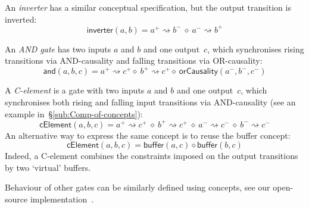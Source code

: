 \documentclass[british,compsoc]{IEEEtran}
\begin{document}
An \emph{inverter} has a similar conceptual specification, but the
output transition is inverted:
\[
\mathsf{inverter}(a, b)=a^{+}\rightsquigarrow b^{-}\ \diamond\ a^{-}\rightsquigarrow b^{+}
\]

An \emph{AND gate} has two inputs $a$ and $b$ and one output~$c$, which
synchronises rising transitions via AND-causality and falling transitions
via OR-causality:
\[
\mathsf{and}(a, b, c)=a^{+}\!\rightsquigarrow\!c^{+} \diamond\ b^{+}\!\rightsquigarrow\! c^{+} \diamond\ \mathsf{orCausality}(a^{-},b^{-},c^{-})
\]

A \emph{C-element} is a gate with two inputs $a$ and $b$ and one
output~$c$, which synchronises both rising and falling input transitions
via AND-causality (see an example in~\S\ref{sub:Comp-of-concepts}):
\[
\mathsf{cElement}(a, b, c)=a^{+}\!\rightsquigarrow\! c^{+}\ \diamond\ b^{+}\!\rightsquigarrow\! c^{+}\ \diamond\ a^{-}\!\rightsquigarrow\! c^{-}\ \diamond\ b^{-}\!\rightsquigarrow\! c^{-}
\]
An alternative way to express the same concept is to reuse the buffer concept:
\[
\mathsf{cElement}(a, b, c)=\mathsf{buffer}(a, c) \diamond \mathsf{buffer}(b, c)
\]
Indeed, a C-element combines the constraints imposed on the output
transitions by two `virtual' buffers.

Behaviour of other gates can be similarly defined using concepts,
see our open-source implementation~\cite{2016_concepts_github}.
\end{document}
